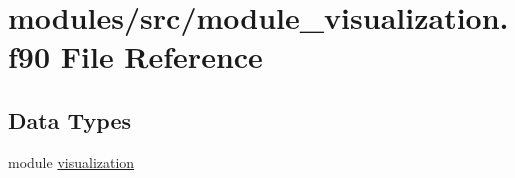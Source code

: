 \hypertarget{module__visualization_8f90}{
\section{modules/src/module\-\_\-visualization.f90 \-File \-Reference}
\label{module__visualization_8f90}
}
\subsection*{\-Data \-Types}
\begin{DoxyCompactItemize}
\item 
module \hyperlink{classvisualization}{visualization}
\end{DoxyCompactItemize}
